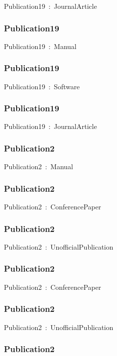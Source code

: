 \documentclass{article}
\begin{document}
Publication19~:~JournalArticle

\subsubsection*{Publication19}

Publication19~:~Manual

\subsubsection*{Publication19}

Publication19~:~Software

\subsubsection*{Publication19}

Publication19~:~JournalArticle

\subsubsection*{Publication2}

Publication2~:~Manual

\subsubsection*{Publication2}

Publication2~:~ConferencePaper

\subsubsection*{Publication2}

Publication2~:~UnofficialPublication

\subsubsection*{Publication2}

Publication2~:~ConferencePaper

\subsubsection*{Publication2}

Publication2~:~UnofficialPublication

\subsubsection*{Publication2}
\end{document}
